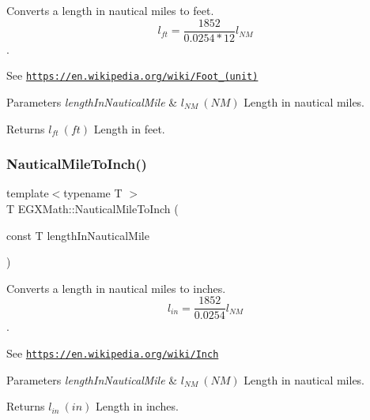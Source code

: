 Converts a length in nautical miles to feet. \[ l_{ft}= \frac{1852}{0.0254 * 12} l_{NM} \]. 

See \href{https://en.wikipedia.org/wiki/Foot_(unit)}{\tt https\+://en.\+wikipedia.\+org/wiki/\+Foot\+\_\+(unit)} 
\begin{DoxyParams}{Parameters}
{\em length\+In\+Nautical\+Mile} & $ l_{NM}\ (NM)$ Length in nautical miles. \\
\hline
\end{DoxyParams}
\begin{DoxyReturn}{Returns}
$ l_{ft}\ (ft)$ Length in feet. 
\end{DoxyReturn}
\mbox{\label{group___e_g_x_math-_conversions-_length_conversions-_nautical-_nautical_mile-_imperial_ga5ec58ed7dbd23bcfb8290e1e476f354b}} 
\subsubsection{\texorpdfstring{Nautical\+Mile\+To\+Inch()}{NauticalMileToInch()}}
{\footnotesize\ttfamily template$<$typename T $>$ \\
T E\+G\+X\+Math\+::\+Nautical\+Mile\+To\+Inch (\begin{DoxyParamCaption}\item[{const T}]{length\+In\+Nautical\+Mile }\end{DoxyParamCaption})}



Converts a length in nautical miles to inches. \[ l_{in}= \frac{1852}{0.0254} l_{NM} \]. 

See \href{https://en.wikipedia.org/wiki/Inch}{\tt https\+://en.\+wikipedia.\+org/wiki/\+Inch} 
\begin{DoxyParams}{Parameters}
{\em length\+In\+Nautical\+Mile} & $ l_{NM}\ (NM)$ Length in nautical miles. \\
\hline
\end{DoxyParams}
\begin{DoxyReturn}{Returns}
$ l_{in}\ (in)$ Length in inches. 
\end{DoxyReturn}
\mbox{\label{group___e_g_x_math-_conversions-_length_conversions-_nautical-_nautical_mile-_imperial_ga30322f1dff254ba1eff05b0d10617fe7}} 
